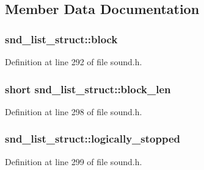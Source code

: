 \subsection{Member Data Documentation}
\subsubsection[{\texorpdfstring{block}{block}}]{ snd\+\_\+list\+\_\+struct\+::block}\hypertarget{structsnd__list__struct_aaf6e754e36ceada326133f729fc4462c}{}\label{structsnd__list__struct_aaf6e754e36ceada326133f729fc4462c}


Definition at line 292 of file sound.\+h.

\subsubsection[{\texorpdfstring{block\+\_\+len}{block_len}}]{\setlength{\rightskip}{0pt plus 5cm}short snd\+\_\+list\+\_\+struct\+::block\+\_\+len}\hypertarget{structsnd__list__struct_a809aedecf6147df4ec4b45404cfab414}{}\label{structsnd__list__struct_a809aedecf6147df4ec4b45404cfab414}


Definition at line 298 of file sound.\+h.

\subsubsection[{\texorpdfstring{logically\+\_\+stopped}{logically_stopped}}]{ snd\+\_\+list\+\_\+struct\+::logically\+\_\+stopped}\hypertarget{structsnd__list__struct_a09cdf89fd12d89166b27e4c3963420b3}{}\label{structsnd__list__struct_a09cdf89fd12d89166b27e4c3963420b3}


Definition at line 299 of file sound.\+h.

